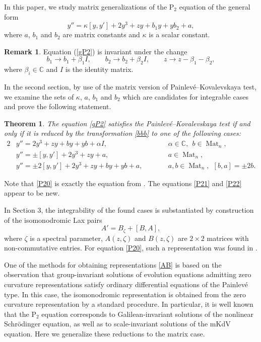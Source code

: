 \documentclass{article}
\theoremstyle{plain}
\newtheorem{theorem}{Theorem}
\theoremstyle{definition}
\newtheorem{remark}{Remark}
\DeclareMathOperator{\Mat}{Mat}
\begin{document}
In this paper, we study matrix generalizations of the P$_2$ equation of the general form
\begin{equation}\label{gP2}
 y''= \kappa[y,y'] +2y^3 +z y +b_1 y +y b_2 +a,
\end{equation}
where $a$, $b_1$ and $b_2$ are matrix constants and $\kappa$ is a scalar constant.

\begin{remark} 
Equation (\ref{gP2}) is invariant under the change
\begin{equation}\label{bbb}
b_1\to b_1+\beta_1I,\qquad  b_2\to b_2+\beta_2I,\qquad z\to z-\beta_1-\beta_2, 
\end{equation} 
where $\beta_i\in{\mathbb C}$ and $I$ is the identity matrix.
\end{remark} 

In the second section, by use of the matrix version of Painlev\'e--Kovalevskaya test, we examine the sets of $\kappa$, $a$, $b_1$ and $b_2$ which are candidates for integrable cases and prove the following statement.

\begin{theorem}
The equation \eqref{gP2} satisfies the Painlev\'e--Kovalevskaya test if and only if it is reduced by the transformation \eqref{bbb} to one of the following cases:
\begin{alignat}{2}
\label{P20}\tag*{P$_2^0$}
 & y''= 2y^3+zy+by+yb+\alpha I, &\qquad& \alpha\in{\mathbb C},~~ b\in\Mat_n,\\
\label{P21}\tag*{P$_2^1$}
 & y''= \pm[y,y']+2y^3+zy+a, && a\in\Mat_n,\\
\label{P22}\tag*{P$_2^2$}
 & y''= \pm2[y,y']+2y^3+zy+by+yb+a, && a,b\in\Mat_n,~~ [b,a]=\pm2b.
\end{alignat}
\end{theorem}

Note that \ref*{P20} is exactly the equation from \cite{Retakh_Rubtsov_2010}. The equations \ref*{P21} and \ref*{P22} appear to be new.

In Section 3, the integrability of the found cases is substantiated by construction of the isomonodromic Lax pairs
\begin{equation}\label{AB}
 A'=B_\zeta+[B,A],
\end{equation}
where $\zeta$ is a spectral parameter, $A(z,\zeta)$ and $B(z,\zeta)$ are $2\times2$ matrices with non-commutative entries. For equation \ref*{P20}, such a representation was found in \cite{Irfan_2012}.

One of the methods for obtaining representations \eqref{AB} is based on the observation that group-invariant solutions of evolution equations admitting zero curvature representations satisfy ordinary differential equations of the Painlev\'e type. In this case, the isomonodromic representation is obtained from the zero curvature representation by a standard procedure. In particular, it is well known that the P$_2$ equation corresponds to Galilean-invariant solutions of the nonlinear Schr\"odinger equation, as well as to scale-invariant solutions of the mKdV equation. Here we generalize these reductions to the matrix case.
\end{document}
